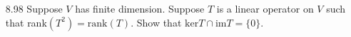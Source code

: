\documentclass[12pt]{article}
\theoremstyle{definition}
\theoremstyle{plain}
\begin{document}
\begin{enumerate}
\item[8.98] Suppose $V$ has finite dimension. Suppose $T$ is a linear operator on $V$ such that rank$(T^2)=\mathrm{rank}(T)$. Show that $\mathrm{ker}T \cap \mathrm{im}T = \{0\}$.
	
	
	
	
	
	
	
	
	
	
\end{enumerate}
\end{document}
